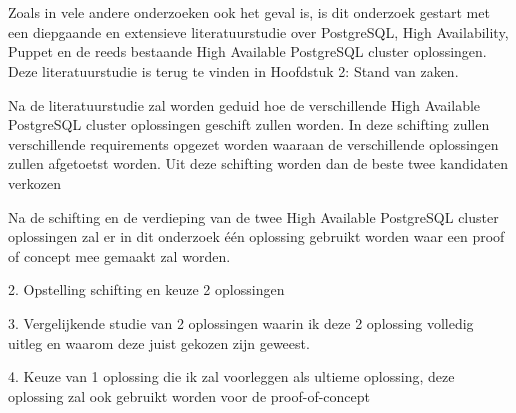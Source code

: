 
\chapter{}
\label{ch:methodologie}


Zoals in vele andere onderzoeken ook het geval is, is dit onderzoek gestart met een diepgaande en extensieve literatuurstudie over PostgreSQL, High Availability, Puppet en de reeds bestaande High Available PostgreSQL cluster oplossingen. Deze literatuurstudie is terug te vinden in Hoofdstuk 2: Stand van zaken.

Na de literatuurstudie zal worden geduid hoe de verschillende High Available PostgreSQL cluster oplossingen geschift zullen worden. In deze schifting zullen verschillende requirements opgezet worden waaraan de verschillende oplossingen zullen afgetoetst worden.
Uit deze schifting worden dan de beste twee kandidaten verkozen %

Na de schifting en de verdieping van de twee High Available PostgreSQL cluster oplossingen zal er in dit onderzoek één oplossing gebruikt worden waar een proof of concept mee gemaakt zal worden.

2. Opstelling schifting en keuze 2 oplossingen


3. Vergelijkende studie van 2 oplossingen waarin ik deze 2 oplossing volledig uitleg en waarom deze juist gekozen zijn geweest.


4. Keuze van 1 oplossing die ik zal voorleggen als ultieme oplossing, deze oplossing zal ook gebruikt worden voor de proof-of-concept

